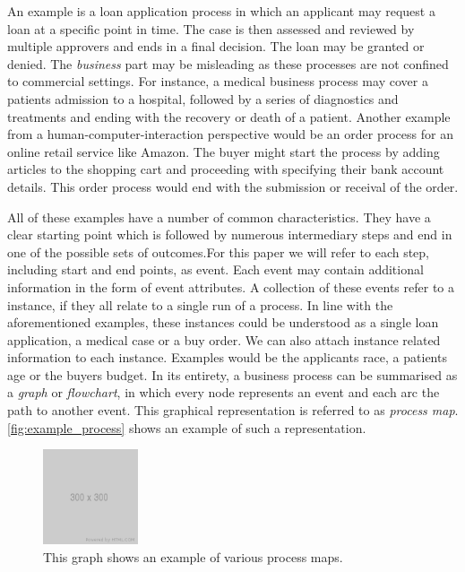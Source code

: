 \documentclass[12pt,a4paper]{report}
\begin{document}
An example is a loan application process in which an applicant may request a loan at a specific point in time. The case is then assessed and reviewed by multiple approvers and ends in a final decision. The loan may be granted or denied. The \emph{business} part may be misleading as these processes are not confined to commercial settings. For instance, a medical business process may cover a patients admission to a hospital, followed by a series of diagnostics and treatments and ending with the recovery or death of a patient. Another example from a human-computer-interaction perspective would be an order process for an online retail service like Amazon. The buyer might start the process by adding articles to the shopping cart and proceeding with specifying their bank account details. This order process would end with the submission or receival of the order.

All of these examples have a number of common characteristics. They have a clear starting point which is followed by numerous intermediary steps and end in one of the possible sets of outcomes.For this paper we will refer to each step, including start and end points, as \gls{event}. Each \gls{event} may contain additional information in the form of event attributes. A collection of these \glspl{event} refer to a \gls{instance}, if they all relate to a single run of a process. In line with the aforementioned examples, these \glspl{instance} could be understood as a single loan application, a medical case or a buy order. We can also attach \gls{instance} related information to each instance. Examples would be the applicants race, a patients age or the buyers budget. In its entirety, a business process can be summarised as a \emph{graph} or \emph{flowchart}, in which every node represents an event and each arc the path to another event. This graphical representation is referred to as \emph{process map}. \autoref{fig:example_process} shows an example of such a representation.


\begin{figure}[htb]
    \centering
    \includegraphics[width=0.25\textwidth]{figures/misc/placeholder.png}
    \caption{This graph shows an example of various process maps.}
    \label{fig:example_process}
\end{figure}
\end{document}
